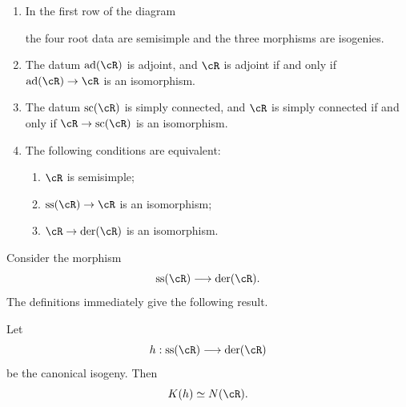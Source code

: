 \begin{proposition}\label{sga3:XXI:6.5.5}
\begin{enumerate}
\item[(i)] In the first row of the diagram
\begin{center}
\end{center}
the four root data are semisimple and the three morphisms are
isogenies.
\item[(ii)] The datum \(\operatorname{ad}(\cR)\) is adjoint, and
\(\cR\) is adjoint if and only if
\(\operatorname{ad}(\cR)\to\cR\) is an isomorphism.
\item[(iii)] The datum \(\operatorname{sc}(\cR)\) is simply connected,
and \(\cR\) is simply connected if and only if
\(\cR\to\operatorname{sc}(\cR)\) is an isomorphism.
\item[(iv)] The following conditions are equivalent:
\begin{enumerate}
\item[(a)] \(\cR\) is semisimple;
\item[(b)] \(\operatorname{ss}(\cR)\to\cR\) is an isomorphism;
\item[(c)] \(\cR\to\operatorname{der}(\cR)\) is an isomorphism.
\end{enumerate}
\end{enumerate}
\end{proposition}

Consider the morphism
\[
 \operatorname{ss}(\cR)\longrightarrow\operatorname{der}(\cR).
\]
The definitions immediately give the following result.

\begin{lemma}\label{sga3:XXI:6.5.6}
Let
\[
 h:\operatorname{ss}(\cR)\longrightarrow\operatorname{der}(\cR)
\]
be the canonical isogeny. Then
\[
 K(h)\simeq N(\cR).
\]
\end{lemma}

